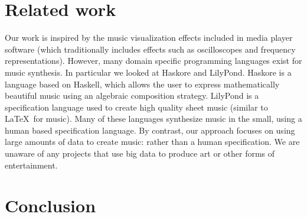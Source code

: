 \documentclass[10pt, conference, compsocconf]{IEEEtran}
\begin{document}
\section{Related work}

Our work is inspired by the music visualization effects included in
media player software (which traditionally includes effects such as
oscilloscopes and frequency representations).  However, many domain
specific programming languages exist for music synthesis.  In
particular we looked at Haskore \cite{haskore} and
LilyPond\cite{lilypond}.  Haskore is a language based on Haskell,
which allows the user to express mathematically beautiful music using
an algebraic composition strategy.  LilyPond is a specification
language used to create high quality sheet music (similar to \LaTeX\ 
for music).  Many of these languages synthesize music in the small,
using a human based specification language.  By contrast, our approach
focuses on using large amounts of data to create music: rather than a
human specification.  We are unaware of any projects that use big data
to produce art or other forms of entertainment.

\section{Conclusion}





\end{document}
